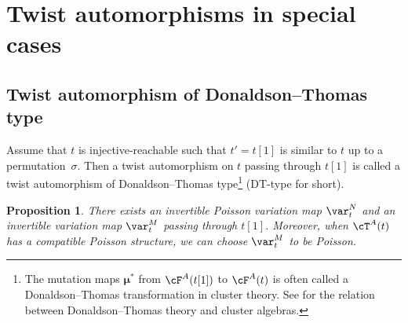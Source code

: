 \documentclass[pdftex]{sigma}
\newcommand{\seq}{\boldsymbol{\mu}}%
\numberwithin{equation}{section}
\newtheorem{Proposition}[Theorem]{Proposition}
 { \theoremstyle{definition}
\newtheorem{Definition}[Theorem]{Definition}
\newtheorem{Note}[Theorem]{Note}
\newtheorem{Example}[Theorem]{Example}
\newtheorem{Remark}[Theorem]{Remark}
\newtheorem{Assumption}[Theorem]{Assumption}
}
\begin{document}
\section{Twist automorphisms in special cases}\label{sec:Twist-automorphisms-special-cases}

\subsection{Twist automorphism of Donaldson--Thomas type}\label{subsec:Cluster-twist-automorphism-DT}

Assume that $t$ is injective-reachable such that $t'=t[1]$ is similar
to $t$ up to a permutation~$\sigma$. Then a twist automorphism on
$t$ passing through $t[1]$ is called a twist automorphism of Donaldson--Thomas
type\footnote{The mutation maps $\seq^{*}$ from $\cF^{A}(t[1])$ to $\cF^{A}(t)$
is often called a Donaldson--Thomas transformation in cluster theory.
See \cite{Nagao10} for the relation between Donaldson--Thomas theory
and cluster algebras.} (DT-type for short).

\begin{Proposition}\label{prop:exist_var_DT}
 There exists an invertible Poisson variation map $\var_{t}^{N}$ and an invertible variation map $\var_{t}^{M}$
passing through $t[1]$. Moreover, when $\cT^A(t)$ has a compatible Poisson structure, we can choose $\var_{t}^{M}$ to be Poisson.
\end{Proposition}
\end{document}
